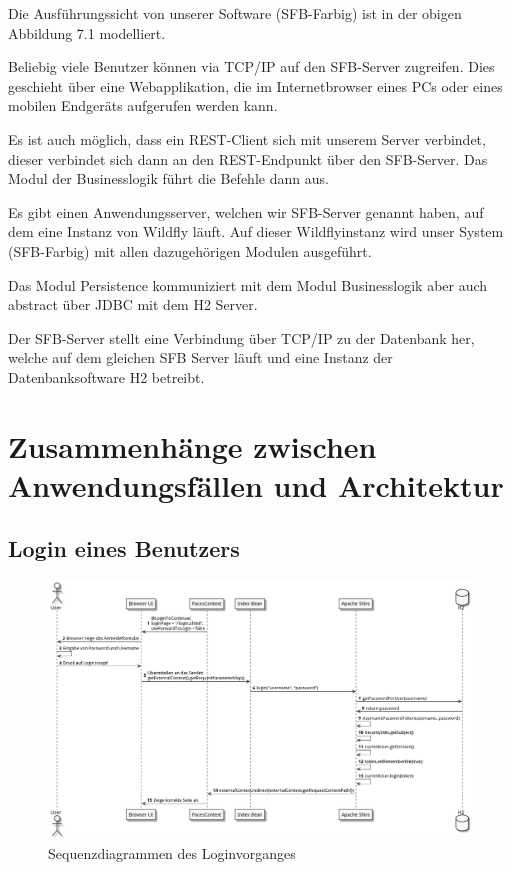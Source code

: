 \documentclass[enabledeprecatedfontcommands,fontsize=12pt,paper=a4,twoside]{scrartcl}
\begin{document}
{{ Die Ausführungssicht von unserer Software (SFB-Farbig) ist in der obigen Abbildung
  7.1 modelliert.

Beliebig viele Benutzer können via TCP/IP auf den SFB-Server zugreifen. Dies
geschieht über eine Webapplikation, die im Internetbrowser eines PCs oder eines
mobilen Endgeräts aufgerufen werden kann.

Es ist auch möglich, dass ein REST-Client sich mit unserem Server verbindet,
dieser verbindet sich dann an den REST-Endpunkt über den SFB-Server. Das Modul
der Businesslogik führt die Befehle dann aus.

Es gibt einen Anwendungsserver, welchen wir SFB-Server genannt haben, auf dem
eine Instanz von Wildfly läuft. Auf dieser Wildflyinstanz wird unser System (SFB-Farbig)
mit allen dazugehörigen Modulen ausgeführt.

Das Modul Persistence kommuniziert mit dem Modul Businesslogik aber auch
\glqq abstract\grqq{} über JDBC mit dem H2 Server.

Der SFB-Server stellt eine Verbindung über TCP/IP zu der
Datenbank her, welche auf dem gleichen SFB Server läuft und eine Instanz der Datenbanksoftware H2 betreibt.
}

\section[Zusammenhänge zwischen Anwendungsfällen und Architektur]{Zusammenhänge zwischen Anwendungsfällen und Architektur}
\label{sec:anwendungsfaelle}


\subsection{Login eines Benutzers}
\begin{figure}[H]
  \includegraphics[width=\linewidth]{UML/aw/erstbenutzung.png}
  \caption{Sequenzdiagrammen des Loginvorganges}
  \label{fig:erstbenutzung.png}
\end{figure}

}
\end{document}
